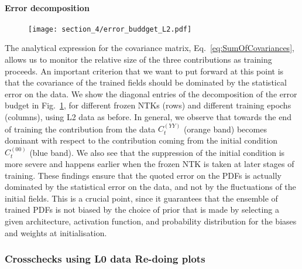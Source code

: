 \paragraph{Error decomposition}
\begin{figure}[t!]
  \centering
  \texttt{[image: section\_4/error\_buddget\_L2.pdf]}
  \caption{}
  \label{fig:ErrorBudgetL2}
\end{figure}
The analytical expression for the covariance matrix,
Eq.~\eqref{eq:SumOfCovariances}, allows us to monitor the relative size of the
three contributions as training proceeds. An important criterion that we want to
put forward at this point is that the covariance of the trained fields should be
dominated by the statistical error on the data. We show the diagonal entries of
the decomposition of the error budget in Fig.~\ref{fig:ErrorBudgetL2}, for
different frozen NTKs (rows) and different training epochs (columns), using L2
data as before. In general, we observe that towards the end of training the
contribution from the data $C_t^{(YY)}$ (orange band) becomes dominant with
respect to the contribution coming from the initial condition $C_t^{(00)}$ (blue
band). We also see that the suppression of the initial condition is more severe
and happens earlier when the frozen NTK is taken at later stages of training.
These findings ensure that the quoted error on the PDFs is actually dominated by
the statistical error on the data, and not by the fluctuations of the initial
fields. This is a crucial point, since it guarantees that the ensemble of
trained PDFs is not biased by the choice of prior that is made by selecting a
given architecture, activation function, and probability distribution for the
biases and weights at initialisation.

\subsubsection{Crosschecks using L0 data \ac{Re-doing plots}}
\label{sec:AnalyticalChecks}

